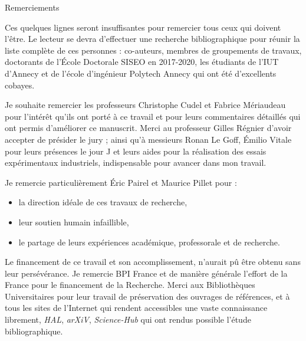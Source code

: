{}

\chead[\fancyplain{}{}]
{\fancyplain{}{}}
\lfoot[\fancyplain{}{}]
{\fancyplain{}{}}
\cfoot[\fancyplain{}{\thepage}]
{\fancyplain{}{\thepage}}
\rfoot[\fancyplain{}{}]%
{\fancyplain{}{\scriptsize}}

\vspace*{0mm}
\begin{flushright}
	\fontsize{20pt}{20pt}\selectfont\textnormal{Remerciements}
\end{flushright}

Ces quelques lignes seront insuffisantes pour remercier tous ceux qui doivent l'être.
Le lecteur se devra d'effectuer une recherche bibliographique pour réunir la liste complète de ces personnes : co-auteurs, membres de groupements de travaux, doctorants de l'École Doctorale SISEO en 2017-2020, les étudiants de l'IUT d'Annecy et de l'école d'ingénieur Polytech Annecy qui ont été d'excellents cobayes.

\bigskip
\noindent
Je souhaite remercier les professeurs Christophe Cudel et Fabrice Mériaudeau pour l'intérêt qu'ils ont porté à ce travail et pour leurs commentaires détaillés qui ont permis d'améliorer ce manuscrit.
Merci au professeur Gilles Régnier d'avoir accepter de présider le jury ; ainsi qu'à messieurs Ronan Le Goff, Émilio Vitale pour leurs présences le jour J et leurs aides pour la réalisation des essais expérimentaux industriels,  indispensable pour avancer dans mon travail.

\bigskip
\noindent
Je remercie particulièrement Éric Pairel et Maurice Pillet pour :
\begin{itemize}
\item la direction idéale de ces travaux de recherche,
\item leur soutien humain infaillible,
\item le partage de leurs expériences académique, professorale et de recherche.
\end{itemize}
Le financement de ce travail et son accomplissement, n'aurait pû être obtenu sans leur persévérance.
\noindent
Je remercie BPI France et de manière générale l'effort de la France pour le financement de la Recherche.
Merci aux Bibliothèques Universitaires pour leur travail de préservation des ouvrages de références, et à tous les sites de l'Internet qui rendent accessibles une vaste connaissance librement, \textit{HAL}, \textit{arXiV}, \textit{Science-Hub} qui ont rendus possible l'étude bibliographique.

